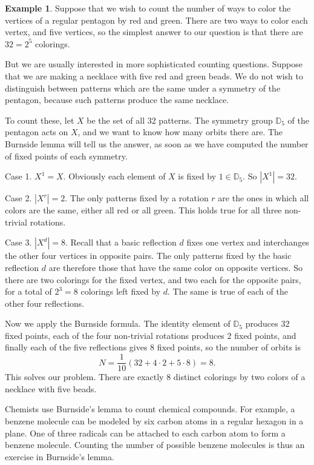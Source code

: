 \documentclass[11pt,oneside]{article}
\theoremstyle{definition}
\newtheorem{example}[thm]{Example}
\newcommand{\D}{\mathbb{D}}
\begin{document}
\begin{example}
Suppose that we wish to count the number of ways to color the vertices
of a regular pentagon by red and green. There are two ways to color
each vertex, and five vertices, so the simplest answer to our question
is that there are $32 = 2^5$ colorings.

But we are usually interested in more sophisticated counting
questions. Suppose that we are making a necklace with five red and
green beads. We do not wish to distinguish between patterns which are
the same under a symmetry of the pentagon, because such patterns
produce the same necklace. 

To count these, let $X$ be the set of all 32 patterns. The symmetry
group $\D_5$ of the pentagon acts on $X$, and we want to know how many
orbits there are. The Burnside lemma will tell us the answer, as soon
as we have computed the number of fixed points of each symmetry. 

Case 1. $X^1 = X$. Obviously each element of $X$ is fixed by $1 \in
\D_5$. So $|X^1| = 32$. 

Case 2. $|X^r|=2$. The only patterns fixed by a rotation $r$ are the
ones in which all colors are the same, either all red or all green.
This holds true for all three non-trivial rotations.

Case 3. $|X^{d}|=8$. Recall that a basic reflection $d$ fixes one
vertex and interchanges the other four vertices in opposite pairs.
The only patterns fixed by the basic reflection $d$ are therefore those
that have the same color on opposite vertices. So there are two
colorings for the fixed vertex, and two each for the opposite pairs,
for a total of $2^3=8$ colorings left fixed by $d$. The same is true
of each of the other four reflections.

Now we apply the Burnside formula. The identity element of $\D_5$
produces 32 fixed points, each of the four non-trivial rotations
produces 2 fixed points, and finally each of the five reflections
gives 8 fixed points, so the number of orbits is
\[
  N = \frac{1}{10}(32 + 4 \cdot 2 + 5 \cdot 8) = 8.
\]
This solves our problem. There are exactly 8 distinct colorings by two
colors of a necklace with five beads.
\end{example}


Chemists use Burnside's lemma to count chemical compounds. For
example, a benzene molecule can be modeled by six carbon atoms in a
regular hexagon in a plane. One of three radicals can be attached to
each carbon atom to form a benzene molecule. Counting the number of
possible benzene molecules is thus an exercise in Burnside's lemma.
\end{document}
